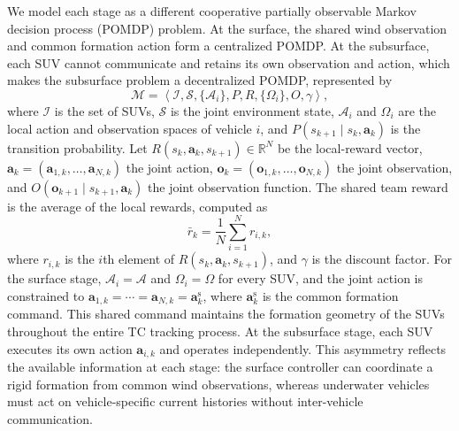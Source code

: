 \documentclass[a4paper,fleqn]{cas-dc}
\begin{document}
We model each stage as a different cooperative partially observable Markov
decision process (POMDP) problem. At the surface, the shared wind observation
and common formation action form a centralized POMDP. At the subsurface, each
SUV cannot communicate and retains its own observation and action, which makes
the subsurface problem a decentralized POMDP, represented by
\begin{equation}
\mathcal{M}=
\left\langle
\mathcal{I},
\mathcal{S},
\{\mathcal{A}_i\},
P,
R,
\{\Omega_i\},
O,
\gamma
\right\rangle,
\label{eq:decpomdp}
\end{equation}
where $\mathcal{I}$ is the set of SUVs, $\mathcal{S}$ is the joint environment
state, \(\mathcal{A}_i\) and \(\Omega_i\) are the local action and observation
spaces of vehicle \(i\), and
\(P(s_{k+1}\mid s_k,\mathbf{a}_k)\) is the transition probability. Let
\(R(s_k,\mathbf{a}_k,s_{k+1})\in\mathbb{R}^{N}\) be the local-reward vector,
$\mathbf{a}_k=(\mathbf{a}_{1,k},\ldots,\mathbf{a}_{N,k})$ the joint action,
$\mathbf{o}_k=(\mathbf{o}_{1,k},\ldots,\mathbf{o}_{N,k})$ the joint
observation, and \(O(\mathbf{o}_{k+1}\mid s_{k+1},\mathbf{a}_k)\) the joint
observation function. The shared team reward is the average of the local
rewards, computed as
\begin{equation}
\bar r_k=\frac{1}{N}\sum_{i=1}^{N}r_{i,k},
\label{eq:team_average_reward}
\end{equation}
where \(r_{i,k}\) is the \(i\)th element of
\(R(s_k,\mathbf{a}_k,s_{k+1})\), and \(\gamma\) is the discount factor.
For the surface stage, $\mathcal{A}_i=\mathcal{A}$ and
$\Omega_i=\Omega$ for every SUV, and the joint action is constrained to
$\mathbf{a}_{1,k}=\cdots=\mathbf{a}_{N,k}=\mathbf{a}_k^{\mathrm{s}}$, where
$\mathbf{a}_k^{\mathrm{s}}$ is the common formation command. This shared
command maintains the formation geometry of the SUVs throughout the entire TC
tracking process. At the subsurface stage, each SUV executes its own action
\(\mathbf{a}_{i,k}\) and operates independently. This asymmetry reflects the
available information at each stage: the surface controller can coordinate a
rigid formation from common wind observations, whereas underwater vehicles must
act on vehicle-specific current histories without inter-vehicle communication.
\end{document}
